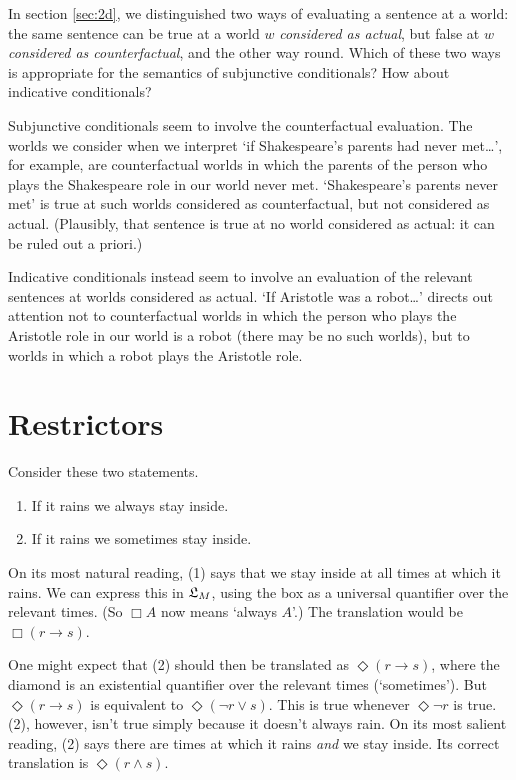 \fi

\begin{exercise}
  In section \ref{sec:2d}, we distinguished two ways of evaluating a sentence at
  a world: the same sentence can be true at a world $w$ \emph{considered as
    actual}, but false at $w$ \emph{considered as counterfactual}, and the other
  way round. Which of these two ways is appropriate for the semantics of
  subjunctive conditionals? How about indicative conditionals?
\end{exercise}
\begin{solution}
  Subjunctive conditionals seem to involve the counterfactual evaluation. The
  worlds we consider when we interpret `if Shakespeare's parents had never
  met\ldots', for example, are counterfactual worlds in which the parents of the
  person who plays the Shakespeare role in our world never met. `Shakespeare's
  parents never met' is true at such worlds considered as counterfactual, but
  not considered as actual. (Plausibly, that sentence is true at no world
  considered as actual: it can be ruled out a priori.)

  Indicative conditionals instead seem to involve an evaluation of the relevant
  sentences at worlds considered as actual. `If Aristotle was a robot\ldots'
  directs out attention not to counterfactual worlds in which the person who
  plays the Aristotle role in our world is a robot (there may be no such
  worlds), but to worlds in which a robot plays the Aristotle role.
\end{solution}


\section{Restrictors}
\label{sec:restrictor-analysis}

Consider these two statements.
\begin{enumerate}[leftmargin=10mm]
  \itemsep-1mm
  \item[(1)] If it rains we always stay inside.
  \item[(2)] If it rains we sometimes stay inside.
\end{enumerate}
On its most natural reading, (1) says that we stay inside at all times at which
it rains. We can express this in $\mathfrak{L}_{M}$, using the box as a universal
quantifier over the relevant times. (So $\Box A$ now means `always $A$'.) The
translation would be $\Box(r \to s)$.

One might expect that (2) should then be translated as $\Diamond(r \to s)$,
where the diamond is an existential quantifier over the relevant times
(`sometimes'). But $\Diamond(r \to s)$ is equivalent to
$\Diamond(\neg r \lor s)$. This is true whenever $\Diamond \neg r$ is true. (2),
however, isn't true simply because it doesn't always rain. On its most salient
reading, (2) says there are times at which it rains \emph{and} we stay inside.
Its correct translation is $\Diamond(r \land s)$.

